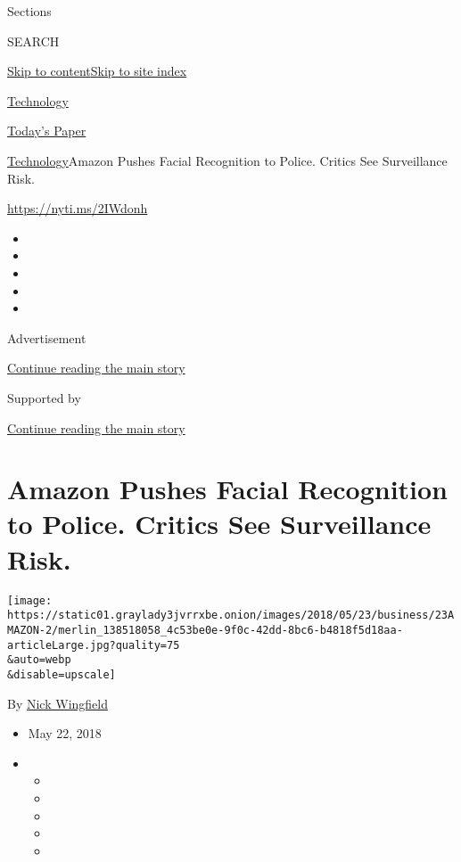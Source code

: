 Sections

SEARCH

\protect\hyperlink{site-content}{Skip to
content}\protect\hyperlink{site-index}{Skip to site index}

\href{https://www.nytimes3xbfgragh.onion/section/technology}{Technology}

\href{https://myaccount.nytimes3xbfgragh.onion/auth/login?response_type=cookie\&client_id=vi}{}

\href{https://www.nytimes3xbfgragh.onion/section/todayspaper}{Today's
Paper}

\href{/section/technology}{Technology}\textbar{}Amazon Pushes Facial
Recognition to Police. Critics See Surveillance Risk.

\url{https://nyti.ms/2IWdonh}

\begin{itemize}
\item
\item
\item
\item
\item
\end{itemize}

Advertisement

\protect\hyperlink{after-top}{Continue reading the main story}

Supported by

\protect\hyperlink{after-sponsor}{Continue reading the main story}

\hypertarget{amazon-pushes-facial-recognition-to-police-critics-see-surveillance-risk}{%
\section{Amazon Pushes Facial Recognition to Police. Critics See
Surveillance
Risk.}\label{amazon-pushes-facial-recognition-to-police-critics-see-surveillance-risk}}

\texttt{[image: https://static01.graylady3jvrrxbe.onion/images/2018/05/23/business/23AMAZON-2/merlin\_138518058\_4c53be0e-9f0c-42dd-8bc6-b4818f5d18aa-articleLarge.jpg?quality=75\\\&auto=webp\\\&disable=upscale]}

By \href{http://www.nytimes3xbfgragh.onion/by/nick-wingfield}{Nick
Wingfield}

\begin{itemize}
\item
  May 22, 2018
\item
  \begin{itemize}
  \item
  \item
  \item
  \item
  \item
  \end{itemize}
\end{itemize}

